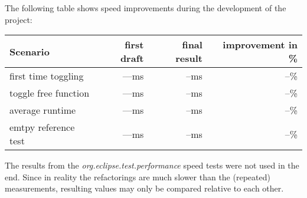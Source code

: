 The following table shows speed improvements during the development of the 
project:

\begin{tabular}[t]{l|rrr}
 Scenario   & first draft & final result & improvement in \% \\
 \hline
 first time toggling 	&  ---ms & --ms & --\% \\
 toggle free function	&  ---ms & --ms & --\% \\
 average runtime	&  ---ms & --ms & --\% \\
 emtpy reference test	&  ---ms & --ms & --\% \\
\end{tabular}

The results from the \textit{org.eclipse.test.performance} speed tests were not 
used in the end. Since in reality the refactorings are much slower than the 
(repeated) measurements, resulting values may only be compared relative to each 
other.

